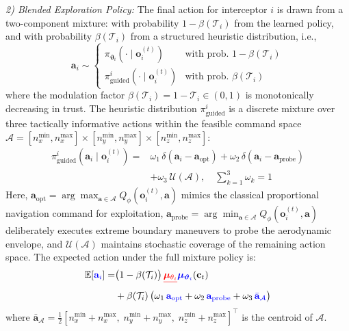 \documentclass[lettersize,journal]{IEEEtran}
\newcommand{\hladd}[1]{{\color{blue}#1}}
\newcommand{\hldel}[1]{{\color{red}\sout{#1}}}
\begin{document}
\emph{2) Blended Exploration Policy:} The final action for interceptor $i$ is drawn from a two-component mixture: with probability $1-\beta(\mathcal{T}_i)$ from the learned policy, and with probability $\beta(\mathcal{T}_i)$ from a structured heuristic distribution, i.e.,
\begin{equation}
\label{eq:exploration_policy}
\mathbf{a}_i \sim \begin{cases} \pi_{\boldsymbol{\vartheta}_i}(\cdot \mid \mathbf{o}_i^{(t)}) & \text{with prob. } 1 - \beta(\mathcal{T}_i) \\ \pi_{\mathrm{guided}}^{i}(\cdot \mid \mathbf{o}_i^{(t)}) & \text{with prob. } \beta(\mathcal{T}_i) \end{cases}
\end{equation}
where the modulation factor $\beta(\mathcal{T}_i) = 1 - \mathcal{T}_i \in (0,1)$ is monotonically decreasing in trust. The heuristic distribution $\pi_{\mathrm{guided}}^{i}$ is a discrete mixture over three tactically informative actions within the feasible command space \hladd{$\mathcal{A} = [n_{x}^{\min},n_{x}^{\max}] \times [n_{y}^{\min},n_{y}^{\max}] \times [n_{z}^{\min},n_{z}^{\max}]$}:
\begin{equation}
\label{eq:guided}
\begin{split}
\pi_{\mathrm{guided}}^{i}(\mathbf{a}_i \mid \mathbf{o}_i^{(t)}) =& \omega_1\,\delta(\mathbf{a}_i - \mathbf{a}_{\mathrm{opt}}) + \omega_2\,\delta(\mathbf{a}_i - \mathbf{a}_{\mathrm{probe}}) \\
&+ \omega_3\,\mathcal{U}(\mathcal{A}), \quad \sum_{k=1}^3\omega_k=1
\end{split}
\end{equation}
Here, \hladd{$\mathbf{a}_{\mathrm{opt}} = \arg\max_{\mathbf{a} \in \mathcal{A}} Q_\phi(\mathbf{o}_i^{(t)}, \mathbf{a})$} mimics the classical proportional navigation command for exploitation, \hladd{$\mathbf{a}_{\mathrm{probe}} = \arg\min_{\mathbf{a} \in \mathcal{A}} Q_\phi(\mathbf{o}_i^{(t)}, \mathbf{a})$} deliberately executes extreme boundary maneuvers to probe the aerodynamic envelope, and $\mathcal{U}(\mathcal{A})$ maintains stochastic coverage of the remaining action space. The expected action under the full mixture policy is:
\begin{equation}
\label{eq:expected_action}
\begin{split}
\mathbb{E}[\hladd{\mathbf{a}_i}] =& \bigl(1-\beta(\mathcal{T}_i)\bigr)\,\hldel{\boldsymbol{\mu}_{\theta_i}}\hladd{\boldsymbol{\mu}_{\boldsymbol{\vartheta}_i}}(\mathbf{c}_t) \\
&+ \beta(\mathcal{T}_i)\,\bigl(\omega_1\,\hladd{\mathbf{a}_{\mathrm{opt}}} + \omega_2\,\hladd{\mathbf{a}_{\mathrm{probe}}} + \omega_3\,\hladd{\bar{\mathbf{a}}_{\mathcal{A}}}\bigr)
\end{split}
\end{equation}
where \hladd{$\bar{\mathbf{a}}_{\mathcal{A}} = \frac{1}{2}[n_x^{\min}+n_x^{\max},\;n_y^{\min}+n_y^{\max},\;n_z^{\min}+n_z^{\max}]^\top$} is the centroid of $\mathcal{A}$.
\end{document}
